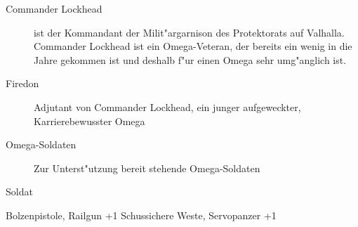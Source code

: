 
\begin{description}
    \item[Commander Lockhead] ist der Kommandant der Milit"argarnison des Protektorats auf Valhalla. Commander Lockhead ist ein 
        Omega-Veteran, der bereits ein wenig in die Jahre gekommen ist und deshalb f"ur einen Omega sehr umg"anglich ist. 
    \item[Firedon] Adjutant von Commander Lockhead, ein junger aufgeweckter, Karrierebewusster Omega
    \item[Omega-Soldaten] Zur Unterst"utzung bereit stehende Omega-Soldaten
\end{description}

\begin{nscsheet}{Soldat}
    \nscstats[ATT=3,AGG=2,CON=2]
    \nscruler
    \begin{nscinventory}
        \nscitem[Waffen] Bolzenpistole, Railgun +1
        \nscitem[R"ustung] Schussichere Weste, Servopanzer +1
    \end{nscinventory}
\end{nscsheet}
